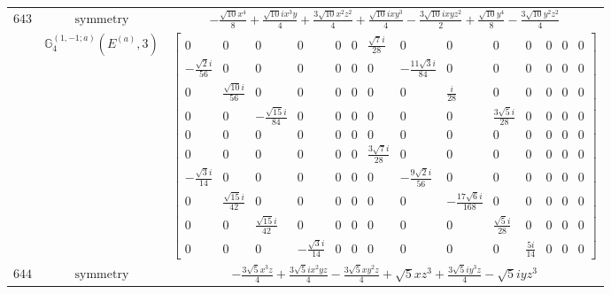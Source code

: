 \documentclass[fleqn,8pt,landscape]{jsarticle}
\begin{document}
\begin{longtable}{ccc}
$ 643 $ & $ \text{symmetry} $ & $ - \frac{\sqrt{10} x^{4}}{8} + \frac{\sqrt{10} i x^{3} y}{4} + \frac{3 \sqrt{10} x^{2} z^{2}}{4} + \frac{\sqrt{10} i x y^{3}}{4} - \frac{3 \sqrt{10} i x y z^{2}}{2} + \frac{\sqrt{10} y^{4}}{8} - \frac{3 \sqrt{10} y^{2} z^{2}}{4} $ \\
$  $ & $ \mathbb{G}_{4}^{(1,-1;a)}(E^{(a)},3) $ & $ \begin{bmatrix} 0 & 0 & 0 & 0 & 0 & 0 & \frac{\sqrt{7} i}{28} & 0 & 0 & 0 & 0 & 0 & 0 & 0 \\ - \frac{\sqrt{2} i}{56} & 0 & 0 & 0 & 0 & 0 & 0 & - \frac{11 \sqrt{3} i}{84} & 0 & 0 & 0 & 0 & 0 & 0 \\ 0 & \frac{\sqrt{10} i}{56} & 0 & 0 & 0 & 0 & 0 & 0 & \frac{i}{28} & 0 & 0 & 0 & 0 & 0 \\ 0 & 0 & - \frac{\sqrt{15} i}{84} & 0 & 0 & 0 & 0 & 0 & 0 & \frac{3 \sqrt{5} i}{28} & 0 & 0 & 0 & 0 \\ 0 & 0 & 0 & 0 & 0 & 0 & 0 & 0 & 0 & 0 & 0 & 0 & 0 & 0 \\ 0 & 0 & 0 & 0 & 0 & 0 & \frac{3 \sqrt{7} i}{28} & 0 & 0 & 0 & 0 & 0 & 0 & 0 \\ - \frac{\sqrt{3} i}{14} & 0 & 0 & 0 & 0 & 0 & 0 & - \frac{9 \sqrt{2} i}{56} & 0 & 0 & 0 & 0 & 0 & 0 \\ 0 & \frac{\sqrt{15} i}{42} & 0 & 0 & 0 & 0 & 0 & 0 & - \frac{17 \sqrt{6} i}{168} & 0 & 0 & 0 & 0 & 0 \\ 0 & 0 & \frac{\sqrt{15} i}{42} & 0 & 0 & 0 & 0 & 0 & 0 & \frac{\sqrt{5} i}{28} & 0 & 0 & 0 & 0 \\ 0 & 0 & 0 & - \frac{\sqrt{3} i}{14} & 0 & 0 & 0 & 0 & 0 & 0 & \frac{5 i}{14} & 0 & 0 & 0 \end{bmatrix} $ \\ \hline
$ 644 $ & $ \text{symmetry} $ & $ - \frac{3 \sqrt{5} x^{3} z}{4} + \frac{3 \sqrt{5} i x^{2} y z}{4} - \frac{3 \sqrt{5} x y^{2} z}{4} + \sqrt{5} x z^{3} + \frac{3 \sqrt{5} i y^{3} z}{4} - \sqrt{5} i y z^{3} $ \\

\end{longtable}
\end{document}
